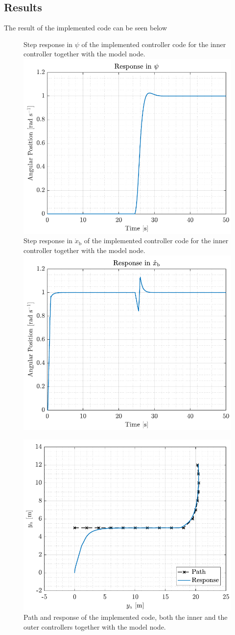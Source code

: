 \subsection*{Results}
The result of the implemented code can be seen below
\begin{figure}[H]
    \captionbox  
    {  
        Step response in $\psi$ of the implemented controller code for the inner controller together with the model node.
        \label{fig:model_node_yaw}                                
    }                                                                 
    {                                                                  
        \includegraphics[width=.45\textwidth]{figures/model_node_yaw}         
    }                                                                    
    \hspace{5pt}                                                  
    \captionbox
    {    
        Step response in $\dot{x}_\mathrm{b}$ of the implemented controller code for the inner controller together with the model node.    
        \label{fig:model_node_xbdot}                               
    }                                                                  
    {                                                                    
        \includegraphics[width=.45\textwidth]{figures/model_node_xbdot}         
    }                                                                         
\end{figure}

\begin{figure}[H]
    \includegraphics[width=.5\textwidth]{figures/model_node_path}
    \caption{Path and response of the implemented code, both the inner and the outer controllers together with the model node.}
    \label{fig:model_node_path}
\end{figure}

